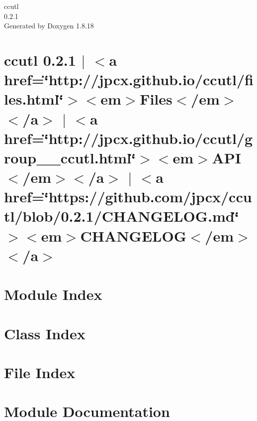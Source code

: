 \let\mypdfximage\pdfximage\def\pdfximage{\immediate\mypdfximage}\documentclass[twoside]{book}
\newcommand{\+}{\discretionary{\mbox{\scriptsize$\hookleftarrow$}}{}{}}
\newcommand{\clearemptydoublepage}{%
  \newpage{\pagestyle{empty}\cleardoublepage}%
}
\begin{document}
\hypersetup{pageanchor=false,
             bookmarksnumbered=true,
             pdfencoding=unicode
            }
\begin{titlepage}
\vspace*{7cm}
\begin{center}%
{\Large ccutl \\[1ex]\large 0.\+2.\+1 }\\
\vspace*{1cm}
{\large Generated by Doxygen 1.8.18}\\
\end{center}
\end{titlepage}
\clearemptydoublepage
{}
\tableofcontents
\clearemptydoublepage
{}
\hypersetup{pageanchor=true}

\chapter{ccutl 0.2.1 $\vert$ $<$a href=\char`\"{}http\+://jpcx.\+github.\+io/ccutl/files.\+html\char`\"{}$>$$<$em$>$Files$<$/em$>$$<$/a$>$ $\vert$ $<$a href=\char`\"{}http\+://jpcx.\+github.\+io/ccutl/group\+\_\+\+\_\+ccutl.\+html\char`\"{}$>$$<$em$>$A\+PI$<$/em$>$$<$/a$>$ $\vert$ $<$a href=\char`\"{}https\+://github.\+com/jpcx/ccutl/blob/0.\+2.\+1/\+C\+H\+A\+N\+G\+E\+L\+O\+G.\+md\char`\"{}$>$$<$em$>$C\+H\+A\+N\+G\+E\+L\+OG$<$/em$>$$<$/a$>$}
\label{index}\hypertarget{index}{}
\chapter{Module Index}

\chapter{Class Index}

\chapter{File Index}

\chapter{Module Documentation}



\end{document}

